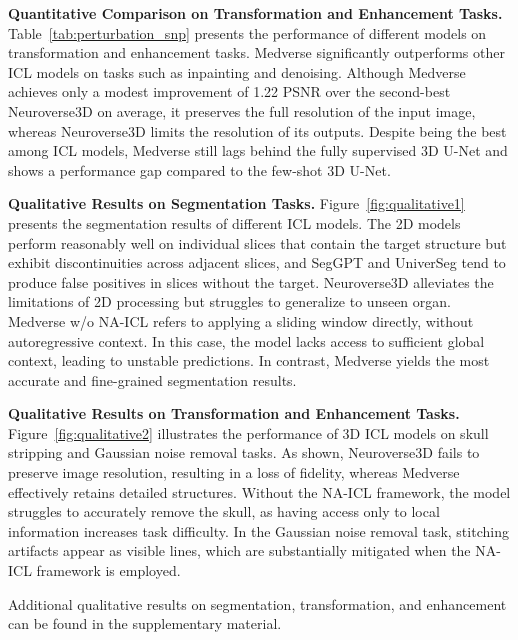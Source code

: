 \vspace{0.4em}
\noindent\textbf{Quantitative Comparison on Transformation and Enhancement Tasks.}  
Table~\ref{tab:perturbation_snp} presents the performance of different models on transformation and enhancement tasks. Medverse significantly outperforms other ICL models on tasks such as inpainting and denoising. Although Medverse achieves only a modest improvement of 1.22 PSNR over the second-best Neuroverse3D on average, it preserves the full resolution of the input image, whereas Neuroverse3D limits the resolution of its outputs. Despite being the best among ICL models, Medverse still lags behind the fully supervised 3D U-Net and shows a performance gap compared to the few-shot 3D U-Net.

\vspace{0.4em}
\noindent\textbf{Qualitative Results on Segmentation Tasks.}  
Figure~\ref{fig:qualitative1} presents the segmentation results of different ICL models. The 2D models perform reasonably well on individual slices that contain the target structure but exhibit discontinuities across adjacent slices, and SegGPT and UniverSeg tend to produce false positives in slices without the target. Neuroverse3D alleviates the limitations of 2D processing but struggles to generalize to unseen organ. Medverse w/o NA-ICL refers to applying a sliding window directly, without autoregressive context. In this case, the model lacks access to sufficient global context, leading to unstable predictions. In contrast, Medverse yields the most accurate and fine-grained segmentation results.


\vspace{0.4em}
\noindent\textbf{Qualitative Results on Transformation and Enhancement Tasks.}  
Figure~\ref{fig:qualitative2} illustrates the performance of 3D ICL models on skull stripping and Gaussian noise removal tasks. As shown, Neuroverse3D fails to preserve image resolution, resulting in a loss of fidelity, whereas Medverse effectively retains detailed structures. Without the NA-ICL framework, the model struggles to accurately remove the skull, as having access only to local information increases task difficulty. In the Gaussian noise removal task, stitching artifacts appear as visible lines, which are substantially mitigated when the NA-ICL framework is employed.

Additional qualitative results on segmentation, transformation, and enhancement can be found in the supplementary material.

